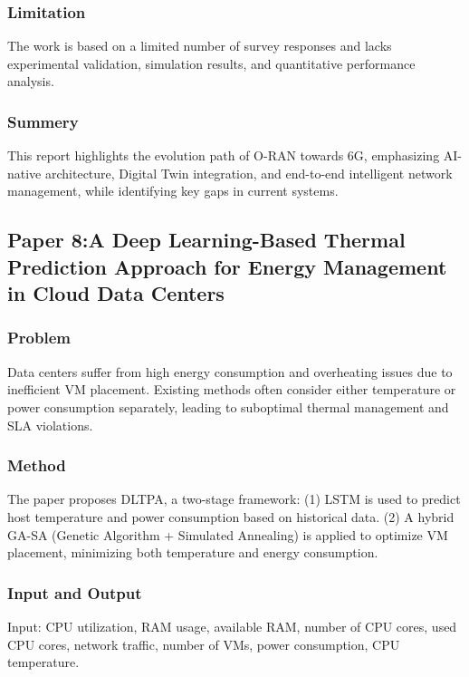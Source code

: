 \documentclass[12pt,a4paper]{article}
\begin{document}
    \subsubsection{Limitation}
    The work is based on a limited number of survey responses and lacks experimental validation, simulation results, and quantitative performance analysis.

    \subsubsection{Summery}
    This report highlights the evolution path of O-RAN towards 6G, emphasizing AI-native architecture, Digital Twin integration, and end-to-end intelligent network management, while identifying key gaps in current systems.
\newpage

\subsection{Paper 8:A Deep Learning-Based Thermal Prediction Approach for Energy Management in Cloud Data Centers}
    \subsubsection{Problem}
                Data centers suffer from high energy consumption and overheating issues due to inefficient VM placement. Existing methods often consider either temperature or power consumption separately, leading to suboptimal thermal management and SLA violations.

    \subsubsection{Method}
                The paper proposes DLTPA, a two-stage framework:
            (1) LSTM is used to predict host temperature and power consumption based on historical data.
            (2) A hybrid GA-SA (Genetic Algorithm + Simulated Annealing) is applied to optimize VM placement, minimizing both temperature and energy consumption.
            
    \subsubsection{Input and Output}
                Input:
            CPU utilization, RAM usage, available RAM, number of CPU cores, used CPU cores, network traffic, number of VMs, power consumption, CPU temperature.
            
\end{document}
